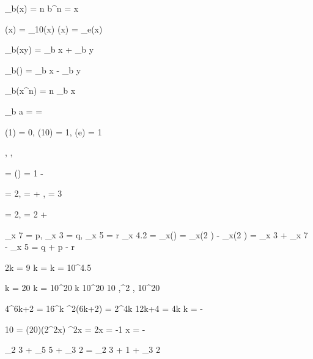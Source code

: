  \log_b(x) = n \iff b^n = x

 \log(x) = \log_{10}(x)
 \ln(x) = \log_e(x)

 \log_b(xy) = \log_b x + \log_b y

 \log_b\!\left(\right) = \log_b x - \log_b y

 \log_b(x^n) = n \log_b x

 \log_b a =  = 

\log(1) = 0, \quad \log(10) = 1, \quad \ln(e) = 1

 , \quad {} , \quad {} 

 = \log\!\left(\right) = 1 -  

 = 2, \quad {} =  + , \quad {} = 3

 = 2, \quad {} = 2 + 

 \log_x 7 = p,\; \log_x 3 = q,\; \log_x 5 = r
\log_x 4.2 = \log_x\!\left(\right)
= \log_x(2  ) - \log_x(2 )
= \log_x 3 + \log_x 7 - \log_x 5
= q + p - r

2\log k = 9 \Rightarrow \log k =  \Rightarrow k = 10^{4.5}

\log k = 20 \Rightarrow k = 10^{20}
 k  10^{20} 
10  ,^2  ,\;  10^{20}  

4^{6k+2} = 16^k ^{2(6k+2)} = 2^{4k} \Rightarrow 12k+4 = 4k \Rightarrow k = -

 10 = (20)(2^{2x})
^{2x} =  \Rightarrow 2x = -1 \Rightarrow x = -

\log_2 3 + \log_5 5 + \log_3 2 = \log_2 3 + 1 + \log_3 2  


